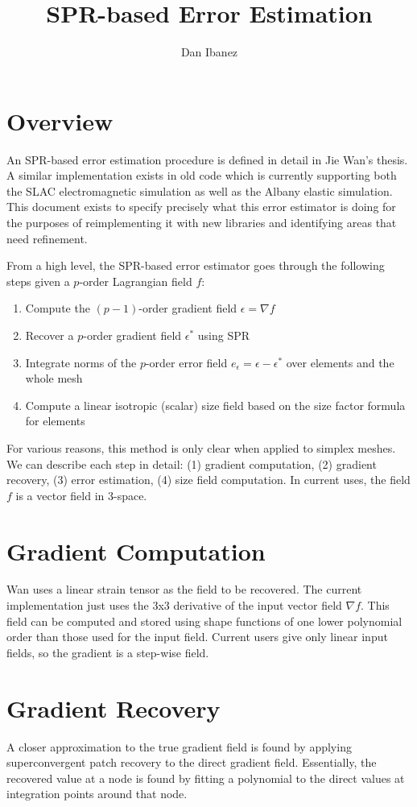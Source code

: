 \documentclass{article}
\title{SPR-based Error Estimation}
\author{Dan Ibanez}
\begin{document}
\maketitle

\section{Overview}
An SPR-based error estimation procedure is defined in detail
in Jie Wan's thesis.
A similar implementation exists in old code which is currently
supporting both the SLAC electromagnetic simulation as well
as the Albany elastic simulation.
This document exists to specify precisely what this error
estimator is doing for the purposes of reimplementing it
with new libraries and identifying areas that need refinement.

From a high level, the SPR-based error estimator goes through
the following steps given a $p$-order Lagrangian field $f$:
\begin{enumerate}
\item Compute the $(p-1)$-order gradient field $\epsilon = \nabla f$
\item Recover a $p$-order gradient field $\epsilon^*$ using SPR
\item Integrate norms of the $p$-order error field
$e_\epsilon = \epsilon - \epsilon^*$
over elements and the whole mesh
\item Compute a linear isotropic (scalar) size field
based on the size factor formula for elements
\end{enumerate}
For various reasons, this method is only clear
when applied to simplex meshes.
We can describe each step in detail: (1) gradient computation,
(2) gradient recovery, (3) error estimation, (4) size field
computation.
In current uses, the field $f$ is a vector field in 3-space.

\section{Gradient Computation}
Wan uses a linear strain tensor as the field to be recovered.
The current implementation just uses the 3x3 derivative
of the input vector field $\nabla f$.
This field can be computed and stored using shape functions
of one lower polynomial order than those used for the input field.
Current users give only linear input fields, so the gradient
is a step-wise field.

\section{Gradient Recovery}
A closer approximation to the true gradient field is found by applying
superconvergent patch recovery to the direct gradient field.
Essentially, the recovered value at a node is found by fitting
a polynomial to the direct values at integration points around
that node.
\end{document}
